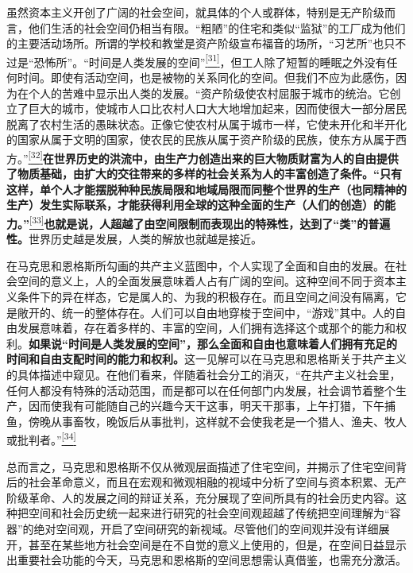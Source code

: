 \documentclass[UTF8, fontset = sourcesans, a4paper, oneside, zihao =
-4, scheme=chinese, no-math, space=true]{ctexbook}
\begin{document}
虽然资本主义开创了广阔的社会空间，就具体的个人或群体，特别是无产阶级而言，他们生活的社会空间仍相当有限。``粗陋''的住宅和类似``监狱''的工厂成为他们的主要活动场所。所谓的学校和教堂是资产阶级宣布福音的场所，``习艺所''也只不过是``恐怖所''。``时间是人类发展的空间''\protect\hypertarget{part0010_split_002.htmlux5cux23w31}{}{}\protect\hyperlink{part0010_split_002.htmlux5cux23m31}{\textsuperscript{{[}31{]}}}，但工人除了短暂的睡眠之外没有任何时间。即使有活动空间，也是被物的关系同化的空间。但我们不应为此感伤，因为在个人的苦难中显示出人类的发展。``资产阶级使农村屈服于城市的统治。它创立了巨大的城市，使城市人口比农村人口大大地增加起来，因而使很大一部分居民脱离了农村生活的愚昧状态。正像它使农村从属于城市一样，它使未开化和半开化的国家从属于文明的国家，使农民的民族从属于资产阶级的民族，使东方从属于西方。''\protect\hypertarget{part0010_split_002.htmlux5cux23w32}{}{}\protect\hyperlink{part0010_split_002.htmlux5cux23m32}{\textsuperscript{{[}32{]}}}\textbf{在世界历史的洪流中，由生产力创造出来的巨大物质财富为人的自由提供了物质基础，由扩大的交往带来的多样的社会关系为人的丰富创造了条件。``只有这样，单个人才能摆脱种种民族局限和地域局限而同整个世界的生产（也同精神的生产）发生实际联系，才能获得利用全球的这种全面的生产（人们的创造）的能力。''}\protect\hypertarget{part0010_split_002.htmlux5cux23w33}{}{}\protect\hyperlink{part0010_split_002.htmlux5cux23m33}{\textsuperscript{{[}33{]}}}\textbf{也就是说，人超越了由空间限制而表现出的特殊性，达到了``类''的普遍性。}世界历史越是发展，人类的解放也就越是接近。

在马克思和恩格斯所勾画的共产主义蓝图中，个人实现了全面和自由的发展。在社会空间的意义上，人的全面发展意味着人占有广阔的空间。这种空间不同于资本主义条件下的异在样态，它是属人的、为我的积极存在。而且空间之间没有隔离，它是敞开的、统一的整体存在。人们可以自由地穿梭于空间中，``游戏''其中。人的自由发展意味着，存在着多样的、丰富的空间，人们拥有选择这个或那个的能力和权利。\textbf{如果说``时间是人类发展的空间''，那么全面和自由也意味着人们拥有充足的时间和自由支配时间的能力和权利。}这一见解可以在马克思和恩格斯关于共产主义的具体描述中窥见。在他们看来，伴随着社会分工的消灭，``在共产主义社会里，任何人都没有特殊的活动范围，而是都可以在任何部门内发展，社会调节着整个生产，因而使我有可能随自己的兴趣今天干这事，明天干那事，上午打猎，下午捕鱼，傍晚从事畜牧，晚饭后从事批判，这样就不会使我老是一个猎人、渔夫、牧人或批判者。''\protect\hypertarget{part0010_split_002.htmlux5cux23w34}{}{}\protect\hyperlink{part0010_split_002.htmlux5cux23m34}{\textsuperscript{{[}34{]}}}

总而言之，马克思和恩格斯不仅从微观层面描述了住宅空间，并揭示了住宅空间背后的社会革命意义，而且在宏观和微观相融的视域中分析了空间与资本积累、无产阶级革命、人的发展之间的辩证关系，充分展现了空间所具有的社会历史内容。这种把空间和社会历史统一起来进行研究的社会空间观超越了传统把空间理解为``容器''的绝对空间观，开启了空间研究的新视域。尽管他们的空间观并没有详细展开，甚至在某些地方社会空间是在不自觉的意义上使用的，但是，在空间日益显示出重要社会功能的今天，马克思和恩格斯的空间思想需认真借鉴，也需充分激活。
\end{document}

